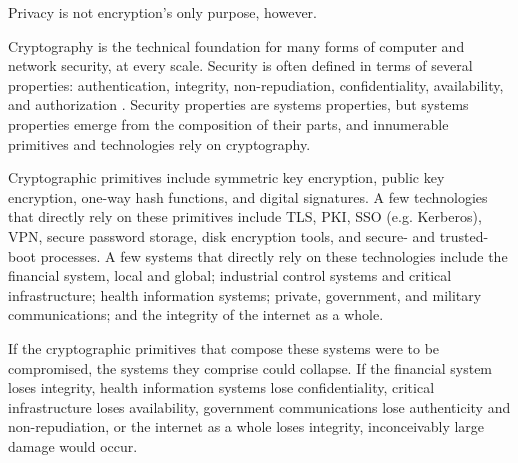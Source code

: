 
Privacy is not encryption's only purpose, however.


Cryptography is the technical foundation for many forms of computer and network security, at every scale. Security is
often defined in terms of several properties: authentication, integrity, non-repudiation, confidentiality, availability,
and authorization \cite{shostack_threat_2014}. Security properties are systems properties, but systems properties emerge
from the composition of their parts, and innumerable primitives and technologies rely on cryptography.

Cryptographic primitives include symmetric key encryption, public key encryption, one-way hash functions, and digital
signatures. A few technologies that directly rely on these primitives include \ac{TLS}, \ac{PKI}, \ac{SSO} (e.g.
Kerberos), \ac{VPN}, secure password storage, disk encryption tools, and secure- and trusted-boot processes. A few
systems that directly rely on these technologies include the financial system, local and global; industrial control
systems and critical infrastructure; health information systems; private, government, and military communications; and
the integrity of the internet as a whole.

If the cryptographic primitives that compose these systems were to be compromised, the systems they comprise could
collapse. If the financial system loses integrity, health information systems lose confidentiality, critical
infrastructure loses availability, government communications lose authenticity and non-repudiation, or the internet as a
whole loses integrity, inconceivably large damage would occur.


